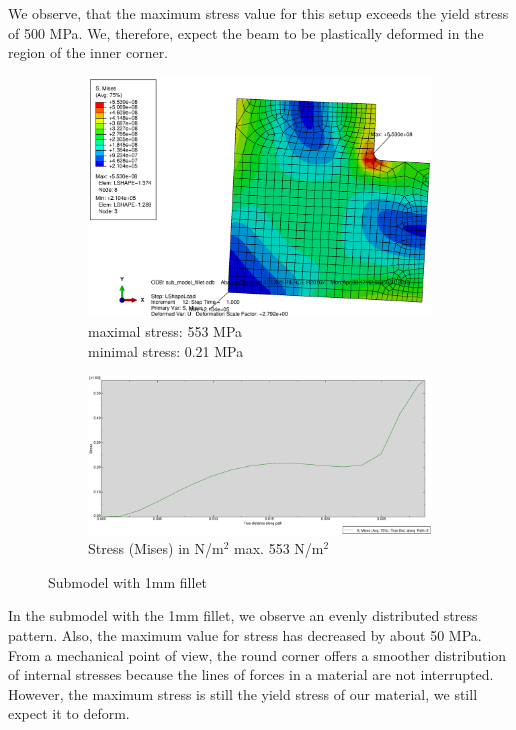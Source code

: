 \documentclass[12pt]{article}
\begin{document}
We observe, that the maximum stress value for this setup exceeds the yield stress of 500 MPa. 
We, therefore, expect the beam to be plastically deformed in the region of the inner corner.

\begin{figure}[!htb]
  \centering
  \begin{subfigure}{.5\textwidth}
    \centering
    \includegraphics[width=0.95\linewidth]{pics/CPS8R_Fillet}
    \caption{maximal stress: 553 MPa \\\hspace{\textwidth}minimal stress: 0.21 MPa}
  \end{subfigure}%
  \begin{subfigure}{.5\textwidth}
    \centering
    \includegraphics[width=0.95\linewidth]{pics/CPS8R_Fillet_Plot}
    \caption{Stress (Mises) in N/m$^{2}$ max. 553 N/m$^{2}$}
   \end{subfigure}
  \caption{Submodel with 1mm fillet}
\end{figure}

In the submodel with the 1mm fillet, we observe an evenly distributed stress pattern. Also,
the maximum value for stress has decreased by about 50 MPa. From a mechanical point of view, 
the round corner offers a smoother distribution of internal stresses because the lines of 
forces in a material are not interrupted\cite{forcelines}. However, the maximum stress is still the yield 
stress of our material, we still expect it to deform.
\pagebreak
\end{document}
